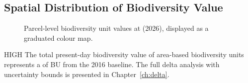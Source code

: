 \subsection{Spatial Distribution of Biodiversity Value}

\begin{figure}[H]
\centering
{}
\caption{Parcel-level biodiversity unit values at \Tone{} (2026), displayed as a graduated colour map.}
\label{fig:bu-choropleth-2026}
\end{figure}

\begin{confidencebox}{HIGH}
The total present-day biodiversity value of  area-based biodiversity units represents a  of  BU from the 2016 baseline. The full delta analysis with uncertainty bounds is presented in Chapter~\ref{ch:delta}.
\end{confidencebox}
